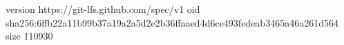 version https://git-lfs.github.com/spec/v1
oid sha256:6ffb22a11b99b37a19a2a5d2e2b36ffaaed4d6ce493fedeab3465a46a261d564
size 110930
